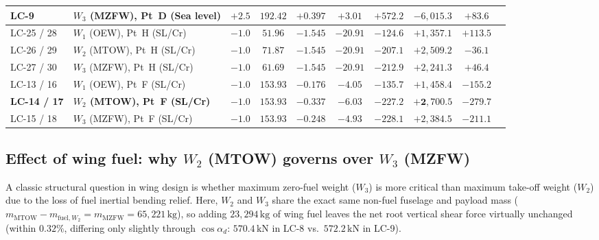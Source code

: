 \begin{table}[htbp]
\begin{tabular}{@{}llcccccccc@{}}
        LC-9      & $W_3$ (MZFW), Pt~D (Sea level) & $+2.5$ & $192.42$ & $+0.397$ & $+3.01$  & $+572.2$ & $-6{,}015.3$ & $+83.6$  \\
        \midrule
        LC-25 / 28 & $W_1$ (OEW), Pt~H (SL/Cr)    & $-1.0$ & $51.96$  & $-1.545$ & $-20.91$ & $-124.6$ & $+1{,}357.1$ & $+113.5$ \\
        LC-26 / 29 & $W_2$ (MTOW), Pt~H (SL/Cr)   & $-1.0$ & $71.87$  & $-1.545$ & $-20.91$ & $-207.1$ & $+2{,}509.2$ & $-36.1$  \\
        LC-27 / 30 & $W_3$ (MZFW), Pt~H (SL/Cr)   & $-1.0$ & $61.69$  & $-1.545$ & $-20.91$ & $-212.9$ & $+2{,}241.3$ & $+46.4$  \\
        LC-13 / 16 & $W_1$ (OEW), Pt~F (SL/Cr)    & $-1.0$ & $153.93$ & $-0.176$ & $-4.05$  & $-135.7$ & $+1{,}458.4$ & $-155.2$ \\
        \textbf{LC-14 / 17} & \textbf{$W_2$ (MTOW), Pt~F (SL/Cr)}   & $\mathbf{-1.0}$ & $\mathbf{153.93}$ & $\mathbf{-0.337}$ & $\mathbf{-6.03}$  & $\mathbf{-227.2}$ & $\mathbf{+2{,}700.5}$ & $\mathbf{-279.7}$ \\
        LC-15 / 18 & $W_3$ (MZFW), Pt~F (SL/Cr)   & $-1.0$ & $153.93$ & $-0.248$ & $-4.93$  & $-228.1$ & $+2{,}384.5$ & $-211.1$ \\
        \bottomrule
    \end{tabular}
\end{table}

\subsection{Effect of wing fuel: why $W_2$ (MTOW) governs over $W_3$ (MZFW)}

A classic structural question in wing design is whether maximum zero-fuel weight ($W_3$) is more critical than maximum take-off weight ($W_2$) due to the loss of fuel inertial bending relief. Here, $W_2$ and $W_3$ share the exact same non-fuel fuselage and payload mass ($m_{\mathrm{MTOW}} - m_{\mathrm{fuel},W_2} = m_{\mathrm{MZFW}} = 65{,}221\,\text{kg}$), so adding $23{,}294\,\text{kg}$ of wing fuel leaves the net root vertical shear force virtually unchanged (within $0.32\%$, differing only slightly through $\cos\alpha_d$: $570.4\,\text{kN}$ in LC-8 vs.\ $572.2\,\text{kN}$ in LC-9).

